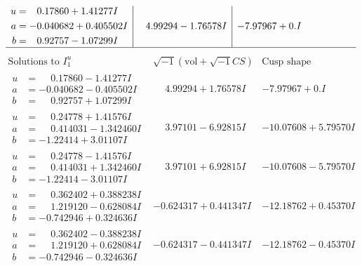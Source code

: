 \documentclass[1p]{elsarticle_modified}
\theoremstyle{definition}
\newcommand{\I}{\sqrt{-1}}
\begin{document}
$$\begin{array}{c|c|c}
\begin{aligned}
u &= \phantom{-}0.17860 + 1.41277 I \\
a &= -0.040682 + 0.405502 I \\
b &= \phantom{-}0.92757 - 1.07299 I\end{aligned}
 & \phantom{-}4.99294 - 1.76578 I & -7.97967 + 0. I\phantom{ +0.000000I}\\
 \hline 
 \end{array}$$\newpage$$\begin{array}{c|c|c}  
\text{Solutions to }I^u_{1}& \I (\text{vol} + \sqrt{-1}CS) & \text{Cusp shape}\\
 \hline 
\begin{aligned}
u &= \phantom{-}0.17860 - 1.41277 I \\
a &= -0.040682 - 0.405502 I \\
b &= \phantom{-}0.92757 + 1.07299 I\end{aligned}
 & \phantom{-}4.99294 + 1.76578 I & -7.97967 + 0. I\phantom{ +0.000000I} \\ \hline\begin{aligned}
u &= \phantom{-}0.24778 + 1.41576 I \\
a &= \phantom{-}0.414031 - 1.342460 I \\
b &= -1.22414 + 3.01107 I\end{aligned}
 & \phantom{-}3.97101 - 6.92815 I & -10.07608 + 5.79570 I \\ \hline\begin{aligned}
u &= \phantom{-}0.24778 - 1.41576 I \\
a &= \phantom{-}0.414031 + 1.342460 I \\
b &= -1.22414 - 3.01107 I\end{aligned}
 & \phantom{-}3.97101 + 6.92815 I & -10.07608 - 5.79570 I \\ \hline\begin{aligned}
u &= \phantom{-}0.362402 + 0.388238 I \\
a &= \phantom{-}1.219120 - 0.628084 I \\
b &= -0.742946 + 0.324636 I\end{aligned}
 & -0.624317 + 0.441347 I & -12.18762 + 0.45370 I \\ \hline\begin{aligned}
u &= \phantom{-}0.362402 - 0.388238 I \\
a &= \phantom{-}1.219120 + 0.628084 I \\
b &= -0.742946 - 0.324636 I\end{aligned}
 & -0.624317 - 0.441347 I & -12.18762 - 0.45370 I \\ \hline\begin{aligned}

\end{aligned}
\end{array}$$
\end{document}
